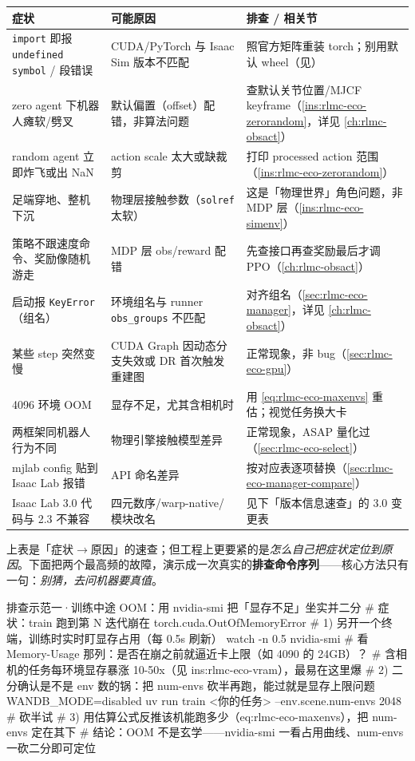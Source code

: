 \begin{center}
\small
\begin{tabular}{@{}p{3.0cm}p{3.4cm}p{6.6cm}@{}}
\toprule
症状 & 可能原因 & 排查 / 相关节 \\
\midrule
\verb|import| 即报 \verb|undefined symbol| / 段错误 & CUDA/PyTorch 与 Isaac Sim 版本不匹配 & 照官方矩阵重装 torch；别用默认 wheel（见\nameref{sec:rlmc-eco-setup}） \\
zero agent 下机器人瘫软/劈叉 & 默认偏置（offset）配错，非算法问题 & 查默认关节位置/MJCF keyframe（\cref{ins:rlmc-eco-zerorandom}，详见 \cref{ch:rlmc-obsact}） \\
random agent 立即炸飞或出 NaN & action scale 太大或缺裁剪 & 打印 processed action 范围（\cref{ins:rlmc-eco-zerorandom}） \\
足端穿地、整机下沉 & 物理层接触参数（\verb|solref| 太软） & 这是「物理世界」角色问题，非 MDP 层（\cref{ins:rlmc-eco-simenv}） \\
策略不跟速度命令、奖励像随机游走 & MDP 层 obs/reward 配错 & 先查接口再查奖励最后才调 PPO（\cref{ch:rlmc-obsact}） \\
启动报 \verb|KeyError|（组名） & 环境组名与 runner \verb|obs_groups| 不匹配 & 对齐组名（\cref{sec:rlmc-eco-manager}，详见 \cref{ch:rlmc-obsact}） \\
某些 step 突然变慢 & CUDA Graph 因动态分支失效或 DR 首次触发重建图 & 正常现象，非 bug（\cref{sec:rlmc-eco-gpu}） \\
4096 环境 OOM & 显存不足，尤其含相机时 & 用 \cref{eq:rlmc-eco-maxenvs} 重估；视觉任务换大卡 \\
两框架同机器人行为不同 & 物理引擎接触模型差异 & 正常现象，ASAP 量化过\,\cite{he2025asap}（\cref{sec:rlmc-eco-select}） \\
mjlab config 贴到 Isaac Lab 报错 & API 命名差异 & 按对应表逐项替换（\cref{sec:rlmc-eco-manager-compare}） \\
Isaac Lab 3.0 代码与 2.3 不兼容 & 四元数序/warp-native/模块改名 & 见下「版本信息速查」的 3.0 变更表 \\
\bottomrule
\end{tabular}
\end{center}

上表是「症状$\to$原因」的速查；但工程上更要紧的是\emph{怎么自己把症状定位到原因}。下面把两个最高频的故障，演示成一次真实的\textbf{排查命令序列}——核心方法只有一句：\emph{别猜，去问机器要真值}。

\begin{codebox}[bash]{排查示范一·训练中途 OOM：用 nvidia-smi 把「显存不足」坐实并二分}
# 症状：train 跑到第 N 迭代崩在 torch.cuda.OutOfMemoryError
# 1) 另开一个终端，训练时实时盯显存占用（每 0.5s 刷新）
watch -n 0.5 nvidia-smi
#    看 Memory-Usage 那列：是否在崩之前就逼近卡上限（如 4090 的 24GB）？
#    含相机的任务每环境显存暴涨 10-50x（见 ins:rlmc-eco-vram），最易在这里爆
# 2) 二分确认是不是 env 数的锅：把 num-envs 砍半再跑，能过就是显存上限问题
WANDB_MODE=disabled uv run train <你的任务> --env.scene.num-envs 2048   # 砍半试
# 3) 用估算公式反推该机能跑多少（eq:rlmc-eco-maxenvs），把 num-envs 定在其下
#    结论：OOM 不是玄学——nvidia-smi 一看占用曲线、num-envs 一砍二分即可定位
\end{codebox}

